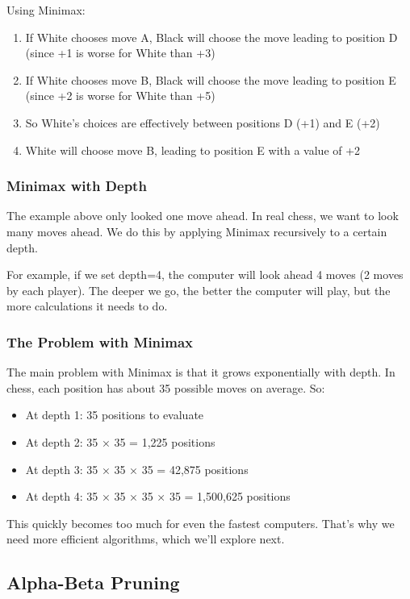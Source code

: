 \documentclass[11pt]{article}
\begin{document}
Using Minimax:
\begin{enumerate}
    \item If White chooses move A, Black will choose the move leading to position D (since +1 is worse for White than +3)
    \item If White chooses move B, Black will choose the move leading to position E (since +2 is worse for White than +5)
    \item So White's choices are effectively between positions D (+1) and E (+2)
    \item White will choose move B, leading to position E with a value of +2
\end{enumerate}

\subsubsection{Minimax with Depth}

The example above only looked one move ahead. In real chess, we want to look many moves ahead. We do this by applying Minimax recursively to a certain depth.

For example, if we set depth=4, the computer will look ahead 4 moves (2 moves by each player). The deeper we go, the better the computer will play, but the more calculations it needs to do.

\subsubsection{The Problem with Minimax}

The main problem with Minimax is that it grows exponentially with depth. In chess, each position has about 35 possible moves on average. So:
\begin{itemize}
    \item At depth 1: 35 positions to evaluate
    \item At depth 2: 35 × 35 = 1,225 positions
    \item At depth 3: 35 × 35 × 35 = 42,875 positions
    \item At depth 4: 35 × 35 × 35 × 35 = 1,500,625 positions
\end{itemize}

This quickly becomes too much for even the fastest computers. That's why we need more efficient algorithms, which we'll explore next.

\subsection{Alpha-Beta Pruning}
\end{document}
